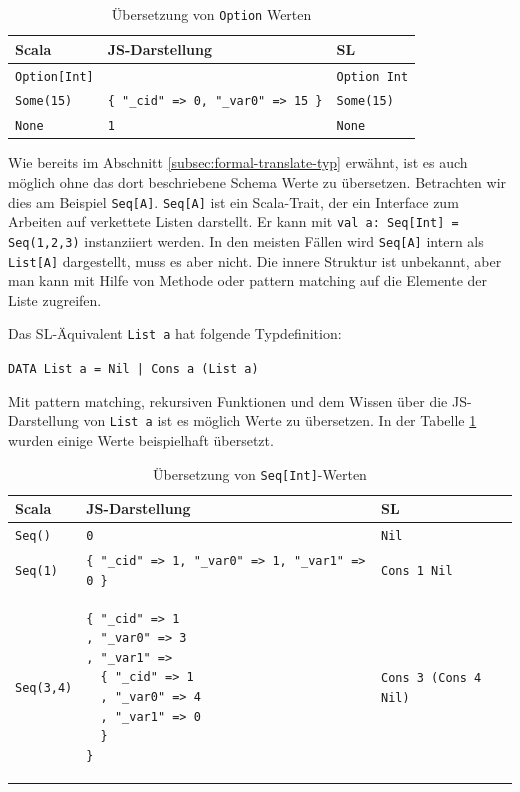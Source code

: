 \documentclass[12pt,bibtotoc]{scrreprt}
\begin{document}
\begin{table}[h]
\caption{Übersetzung von \lstinline!Option! Werten}
\centering
\begin{tabular}{lll}
Scala                   & JS-Darstellung                        & SL \\
\midrule
\lstinline!Option[Int]! &                                            & \lstinline!Option Int! \\
\lstinline!Some(15)!    & \lstinline!{ "_cid" => 0, "_var0" => 15 }! & \lstinline!Some(15)! \\
\lstinline!None!        & \lstinline!1!                              & \lstinline!None! \\
\end{tabular}
\end{table}

Wie bereits im Abschnitt \ref{subsec:formal-translate-typ} erwähnt, ist es auch möglich ohne das dort beschriebene Schema Werte zu übersetzen. Betrachten wir dies am Beispiel \lstinline!Seq[A]!. \lstinline!Seq[A]! ist ein Scala-Trait, der ein Interface zum Arbeiten auf verkettete Listen darstellt. Er kann mit \lstinline!val a: Seq[Int] = Seq(1,2,3)! in­s­tan­zi­ie­rt werden. In den meisten Fällen wird \lstinline!Seq[A]! intern als \lstinline!List[A]! dargestellt, muss es aber nicht. Die innere Struktur ist unbekannt, aber man kann mit Hilfe von Methode oder pattern matching auf die Elemente der Liste zugreifen. 

Das SL-Äquivalent \lstinline!List a! hat folgende Typdefinition:

\begin{center}
\lstinline!DATA List a = Nil | Cons a (List a)!
\end{center}

Mit pattern matching, rekursiven Funktionen und dem Wissen über die JS-Darstellung von \lstinline!List a! ist es möglich Werte zu übersetzen. In der Tabelle \ref{tab:seq-int} wurden einige Werte beispielhaft übersetzt.

\lstset{basicstyle=\ttfamily\small, numbers=none}
\begin{table}[h]
\caption{Übersetzung von \lstinline!Seq[Int]!-Werten}
\centering
\begin{tabular}{lll}
Scala                & JS-Darstellung                        & SL \\
\midrule
\lstinline!Seq()!    & \lstinline!0! & \lstinline!Nil! \\
\lstinline!Seq(1)!   & \lstinline!{ "_cid" => 1, "_var0" => 1, "_var1" => 0 }!                              & \lstinline!Cons 1 Nil! \\
\lstinline!Seq(3,4)! & 
\begin{lstlisting}
{ "_cid" => 1
, "_var0" => 3
, "_var1" => 
  { "_cid" => 1
  , "_var0" => 4
  , "_var1" => 0
  }
}
\end{lstlisting} & \lstinline!Cons 3 (Cons 4 Nil)! \\
\end{tabular}
\label{tab:seq-int}
\end{table}
\lstset{basicstyle=\ttfamily\small, numbers=left, numberstyle=\tiny}
\end{document}
